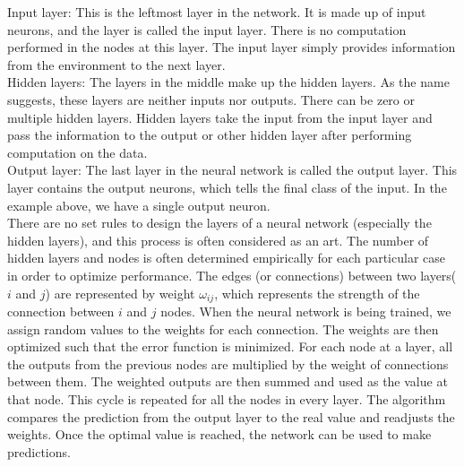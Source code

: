Input layer: This is the leftmost layer in the network. It is made up of input neurons, and the layer is called the input layer. There is no computation performed in the nodes at this layer. The input layer simply provides information from the environment to the next layer. \\
Hidden layers: The layers in the middle make up the hidden layers. As the name suggests, these layers are neither inputs nor outputs. There can be zero or multiple hidden layers. Hidden layers take the input from the input layer and pass the information to the output or other hidden layer after performing computation on the data. \\
Output layer: The last layer in the neural network is called the output layer. This layer contains the output neurons, which tells the final class of the input. In the example above, we have a single output neuron. \\

There are no set rules to design the layers of a neural network (especially the hidden layers), and this process is often considered as an art\cite{NN}. The number of hidden layers and nodes is often determined empirically for each particular case in order to optimize performance. The edges (or connections) between two layers($i$ and $j$) are represented by weight $\omega_{ij}$, which represents the strength of the connection between $i$ and $j$ nodes. When the neural network is being trained, we assign random values to the weights for each connection. The weights are then optimized such that the error function is minimized. For each node at a layer, all the outputs from the previous nodes are multiplied by the weight of connections between them. The weighted outputs are then summed and used as the value at that node. This cycle is repeated for all the nodes in every layer. The algorithm compares the prediction from the output layer to the real value and readjusts the weights. Once the optimal value is reached, the network can be used to make predictions\cite{hall199}.

